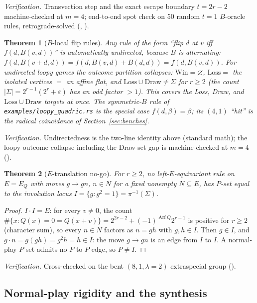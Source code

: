 \documentclass[11pt]{article}
\theoremstyle{plain}
\newtheorem{nogo}{Theorem}
\theoremstyle{definition}
\newcommand{\Arf}{\operatorname{Arf}}
\begin{document}
\noindent\emph{Verification.} Transvection step and the exact escape
boundary $t=2r-2$ machine-checked at $m=4$; end-to-end spot check on $50$
random $t=1$ $B$-oracle rules, retrograde-solved
(,
).

\begin{nogo}[$B$-local flip rules]\label{thm:G}
Any rule of the form ``flip $d$ at $v$ iff $f(d,B(v,d))$'' is automatically
undirected, because $B$ is alternating:
$f(d,B(v+d,d))=f(d,B(v,d)+B(d,d))=f(d,B(v,d))$. For undirected loopy games
the outcome partition collapses: $\mathrm{Win}=\varnothing$,
$\mathrm{Loss}=$ the isolated vertices $=$ an affine flat, and
$\mathrm{Loss}\cup\mathrm{Draw}\neq\Sigma$ for $r\geq2$ (the count
$|\Sigma|=2^{r-1}(2^{r}+\varepsilon)$ has an odd factor $>1$). This covers
the Loss, Draw, and $\mathrm{Loss}\cup\mathrm{Draw}$ targets at once. The
symmetric-$B$ rule of \texttt{examples/loopy\_quadric.rs} is the special
case $f(d,\beta)=\beta$; its $(4,1)$ ``hit'' is the radical coincidence of
Section~\ref{sec:benches}.
\end{nogo}

\noindent\emph{Verification.} Undirectedness is the two-line identity
above (standard math); the loopy outcome collapse including the Draw-set
gap is machine-checked at $m=4$
().

\begin{nogo}[$E$-translation no-go]\label{thm:H}
For $r\geq2$, no left-$E$-equivariant rule on $E=E_Q$ with moves
$g\to gn$, $n\in N$ for a fixed nonempty $N\subseteq E$, has $P$-set equal
to the involution locus $I=\{g:g^2=1\}=\pi^{-1}(\Sigma)$.
\end{nogo}

\begin{proof}
$I\cdot I=E$: for every $v\neq0$, the count
$\#\{x:Q(x)=0=Q(x+v)\}=2^{2r-2}+(-1)^{\Arf Q}2^{r-1}$ is positive for
$r\geq2$ (character sum), so every $n\in N$ factors as $n=gh$ with
$g,h\in I$. Then $g\in I$, and $g\cdot n=g(gh)=g^2h=h\in I$: the move
$g\to gn$ is an edge from $I$ to $I$. A normal-play $P$-set admits no
$P$-to-$P$ edge, so $P\neq I$.
\end{proof}

\noindent\emph{Verification.} Cross-checked on the bent
$(8,1,\lambda=2)$ extraspecial group
().

\subsection{Normal-play rigidity and the synthesis}
\end{document}
